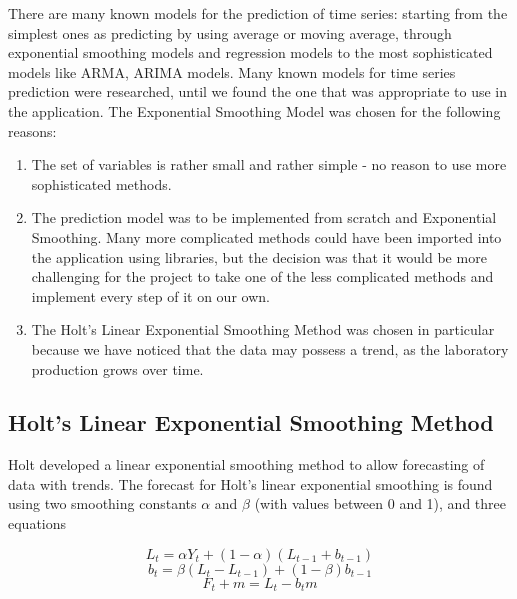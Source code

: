 \documentclass[a4paper,11pt,twoside]{report}
\theoremstyle{definition}
\begin{document}
There are many known models for the prediction of time series: starting from the simplest ones as predicting by using average or moving average, through exponential smoothing models and regression models to the most sophisticated models like ARMA, ARIMA models.
Many known models for time series prediction were researched, until we found the one that was appropriate to use in the application. The Exponential Smoothing Model was chosen for the following reasons:
\begin{enumerate}
\item The set of variables is rather small and rather simple - no reason to use more sophisticated methods.
\item The prediction model was to be implemented from scratch and Exponential Smoothing. Many more complicated methods could have been imported into the application using libraries, but the decision was that it would be more challenging for the project to take one of the less complicated methods and implement every step of it on our own.
\item The Holt's Linear Exponential Smoothing Method was chosen in particular because we have noticed that the data may possess a trend, as the laboratory production grows over time.
\end{enumerate}

\subsection{Holt's Linear Exponential Smoothing Method}

Holt developed a linear exponential smoothing method to allow forecasting of data with trends. The forecast for Holt's linear exponential smoothing is found using two smoothing constants  $\alpha$ and $\beta$ (with values between 0 and 1), and three equations

\begin{equation}\label{Holt's Exponential smoothing 1}
L_t = \alpha Y_t + (1 - \alpha) (L_{t-1} + b_{t-1})
\end{equation}
\begin{equation}\label{Holt's Exponential smoothing 2}
b_t = \beta (L_t - L_{t-1}) + (1 - \beta) b_{t-1}
\end{equation}
\begin{equation}\label{Holt's Exponential smoothing 3}
F_t+m = L_t - b_t m
\end{equation}
\end{document}
